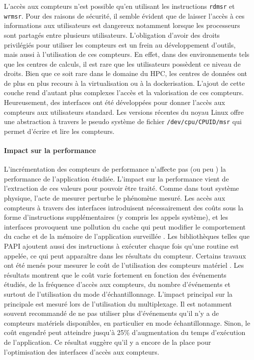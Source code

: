         L'accès aux compteurs n'est possible qu'en utilisant les instructions \verb=rdmsr= et \verb=wrmsr=. Pour des raisons de sécurité, il semble évident que de laisser l'accès à ces informations aux utilisateurs est dangereux notamment lorsque les processeurs sont partagés entre plusieurs utilisateurs. L'obligation d'avoir des droits privilégiés pour utiliser les compteurs est un frein au développement d'outils, mais aussi à l'utilisation de ces compteurs. En effet, dans des environnements tels que les centres de calculs, il est rare que les utilisateurs possèdent ce niveau de droits. Bien que ce soit rare dans le domaine du HPC, les centres de données ont de plus en plus recours à la virtualisation ou à la dockerisation. L'ajout de cette couche rend d'autant plus complexes l'accès et la valorisation de ces compteurs. 
        Heureusement, des interfaces ont été développées pour donner l'accès aux compteurs aux utilisateurs standard. Les versions récentes du noyau Linux offre une abstraction à travers le pseudo système de fichier \verb=/dev/cpu/CPUID/msr= qui permet d'écrire et lire les compteurs. 

    \paragraph{Impact sur la performance}
 
        L'incrémentation des compteurs de performance n'affecte pas (ou peu \cite{Rohl2015}) la performance de l'application étudiée. L'impact sur la performance vient de l'extraction de ces valeurs pour pouvoir être traité. Comme dans tout système physique, l'acte de mesurer perturbe le phénomène mesuré. Les accès aux compteurs à travers des interfaces introduisent nécessairement des coûts sous la forme d'instructions supplémentaires (y compris les appels système), et les interfaces provoquent une pollution du cache qui peut modifier le comportement du cache et de la mémoire de l'application surveillée \cite{Weaver2015}. Les bibliothèques telles que PAPI ajoutent aussi des instructions à exécuter chaque fois qu'une routine est appelée, ce qui peut apparaître dans les résultats du compteur. Certains travaux ont été menés pour mesurer le coût de l'utilisation des compteurs matériel \cite{Bitzes2014}. Les résultats montrent que le coût varie fortement en fonction des événements étudiés, de la fréquence d'accès aux compteurs, du nombre d'événements et surtout de l'utilisation du mode d'échantillonnage. L'impact principal sur la principale est mesuré lors de l'utilisation du multiplexage. Il est notamment souvent recommandé de ne pas utiliser plus d'événements qu'il n'y a de compteurs matériels disponibles, en particulier en mode échantillonnage. Sinon, le coût engendré peut atteindre jusqu'à 25\% d'augmentation du temps d'exécution de l'application. Ce résultat suggère qu'il y a encore de la place pour l'optimisation des interfaces d'accès aux compteurs. 


